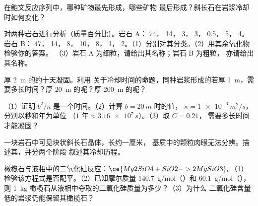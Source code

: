 \begin{exercise}[$\star$]\label{exo:g11:igneous-rocks:5}
在鲍文反应序列中，哪种矿物最先形成，哪些矿物
最后形成？斜长石在岩浆冷却时如何变化？
\end{exercise}

\begin{exercise}[$\star\star$]\label{exo:g11:igneous-rocks:6}
对两种岩石进行分析（质量百分比）。岩石 A： 74，
14， 3， 3， 0.5， 5， 4。岩石 B：
 47， 14， 8， 10， 8，
1， 2。（1）分别对其分类。（2）用其余氧化物检验你的答案。
（3）岩石 A 为细粒，请给出其名称；岩石 B 为粗粒，
亦请给出其名称。
\end{exercise}

\begin{exercise}[$\star\star$]\label{exo:g11:igneous-rocks:7}
厚 \qty{2}{m} 的约十天凝固。利用
关于冷却时间的命题，同种岩浆形成的若厚
\qty{1}{m}，需要多长时间？厚 \qty{20}{m} 的呢？厚 \qty{200}{m} 的呢？
\end{exercise}

\begin{exercise}[$\star\star$]\label{exo:g11:igneous-rocks:8}
（1）证明 $b^2/\kappa$ 是一个时间。（2）计算 $b = \qty{20}{m}$ 时的值，
$\kappa = \qty{1e-6}{m^2/s}$，分别以秒和年为单位
（$\num{1}\text{ 年} \approx \qty{3.16e7}{s}$）。（3）取 $C = 0.21$，
需要多长时间才能凝固？
\end{exercise}

\begin{exercise}[$\star\star$]\label{exo:g11:igneous-rocks:9}
一块岩石中可见块状斜长石晶体，长约一厘米，
基质中的颗粒肉眼无法分辨。描述其，并分两个阶段
叙述其冷却历程。
\end{exercise}

\begin{exercise}[$\star\star$]\label{exo:g11:igneous-rocks:10}
橄榄石与液相中的二氧化硅反应：$\ce{Mg2SiO4 + SiO2 -> 2
MgSiO3}$。（1）检验该方程式是否配平。（2）已知摩尔质量
\qty{140.7}{g/mol}（）和 \qty{60.1}{g/mol}（），
则 \qty{1}{kg} 橄榄石从液相中夺取的二氧化硅质量为多少？（3）为什么
二氧化硅含量低的岩浆仍能保留其橄榄石？
\end{exercise}

